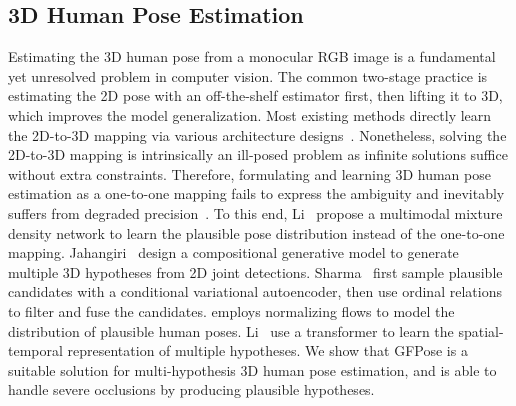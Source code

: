 \documentclass[10pt,twocolumn,letterpaper]{article}
\begin{document}
\subsection{3D Human Pose Estimation}
Estimating the 3D human pose from a monocular RGB image is a fundamental yet unresolved problem in computer vision. The common two-stage practice is estimating the 2D pose with an off-the-shelf estimator first, then lifting it to 3D, which improves the model generalization. Most existing methods directly learn the 2D-to-3D mapping via various architecture designs~\cite{martinez_2017_3dbaseline, lcn-pami, xu2021graph, zhaoCVPR19semantic, ma2021context}. Nonetheless, solving the 2D-to-3D mapping is intrinsically an ill-posed problem as infinite solutions suffice without extra constraints. Therefore, formulating and learning 3D human pose estimation as a one-to-one mapping fails to express the ambiguity and inevitably suffers from degraded precision~\cite{DBLP:conf/eccv/DongSZLZB20, duanrevisiting}. To this end, Li~\etal\cite{Li_2019_CVPR} propose a multimodal mixture density network to learn the plausible pose distribution instead of the one-to-one mapping. Jahangiri~\etal\cite{jahangiri2017generating} design a compositional generative model to generate multiple 3D hypotheses from 2D joint detections. Sharma~\etal \cite{Sharma_2019_ICCV} first sample plausible candidates with a conditional variational autoencoder, then use ordinal relations to filter and fuse the candidates. 
\cite{kolotouros2021prohmr,WehRud2021,pierzchlewicz2022multi} employs normalizing flows to model the distribution of plausible human poses.
Li~\etal\cite{li2022mhformer} use a transformer to learn the spatial-temporal representation of multiple hypotheses.
We show that GFPose is a suitable solution for multi-hypothesis 3D human pose estimation, and is able to handle severe occlusions by producing plausible hypotheses.
\end{document}
